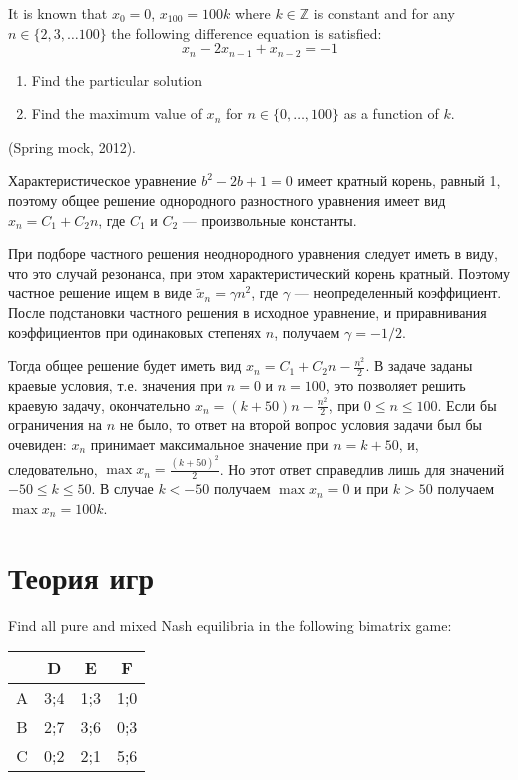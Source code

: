 \begin{problem}
 It is known that $x_0=0$, $x_{100}=100k$ where $k\in \mathbb{Z}$ is constant and for any $n\in\{2,3,\ldots 100\}$ the following difference equation is satisfied:
\[ x_n-2x_{n-1}+x_{n-2}=-1 \]
\begin{enumerate}
\item Find the particular solution
\item Find the maximum value of $x_n$ for $n\in\{0,\ldots,100\}$ as a function of $k$.
\end{enumerate}
(Spring mock, 2012).
\end{problem}

\begin{solution}
Характеристическое уравнение  $b^2-2b+1=0$ имеет кратный корень, равный 1,  поэтому общее решение однородного разностного уравнения имеет вид  $x_n=C_1+C_2 n$, где $C_1$  и $C_2$ --- произвольные константы. 

При подборе частного решения неоднородного уравнения следует иметь в виду, что это случай резонанса, при этом характеристический корень кратный. Поэтому частное решение ищем в виде  $\tilde{x}_n=\gamma n^2$, где $\gamma$  --- неопределенный коэффициент. После подстановки частного решения в исходное уравнение, и приравнивания коэффициентов при одинаковых степенях $n$, получаем  $\gamma=-1/2$. 

Тогда общее решение будет иметь вид   $x_n=C_1+C_2 n-\frac{n^2}{2}$. В задаче заданы краевые условия, т.е. значения   при $n=0$  и $n=100$, это позволяет решить краевую задачу, окончательно $x_n=(k+50) n-\frac{n^2}{2}$, при $0\leq n\leq 100$. Если бы ограничения на  $n$ не было, то ответ на второй вопрос условия задачи был бы очевиден:  $x_n$ принимает максимальное значение при $n=k+50$, и, следовательно,  $\max x_n=\frac{(k+50)^2}{2}$. Но этот ответ справедлив лишь для значений  $-50\leq k \leq 50$. В случае $k< -50$ получаем $\max x_n=0$ и при   $k> 50$ получаем  $\max x_n=100k$.
\end{solution}


\section{Теория игр}


\begin{problem}
Find all pure and mixed Nash equilibria in the following bimatrix game:


\begin{tabular}{c|ccc}
 & D & E & F \\ 
\hline 
A & 3;4 & 1;3 & 1;0  \\ 
B & 2;7 & 3;6 & 0;3  \\ 
C & 0;2 & 2;1 & 5;6  \\ 
\end{tabular} 
\end{problem}

